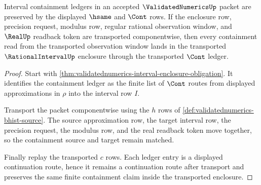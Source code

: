 \begin{theorem}
\label{thm:validatednumerics-containment-ledger-transport}
Interval containment ledgers in an accepted $\ValidatedNumericsUp$ packet are
preserved by the displayed $\hsame$ and $\Cont$ rows. If the enclosure row,
precision request, modulus row, regular rational observation window, and
$\RealUp$ readback token are transported componentwise, then every containment
read from the transported observation window lands in the transported
$\RationalIntervalUp$ enclosure through the transported $\Cont$ ledger.
\end{theorem}
\begin{proof}
Start with \autoref{thm:validatednumerics-interval-enclosure-obligation}. It
identifies the containment ledger as the finite list of $\Cont$ routes from
displayed approximations in $\rho$ into the interval row $I$.

Transport the packet componentwise using the $h$ rows of
\autoref{def:validatednumerics-bhist-source}. The source approximation row, the
target interval row, the precision request, the modulus row, and the real
readback token move together, so the containment source and target remain
matched.

Finally replay the transported $c$ rows. Each ledger entry is a displayed
continuation route, hence it remains a continuation route after transport and
preserves the same finite containment claim inside the transported enclosure.
\end{proof}

